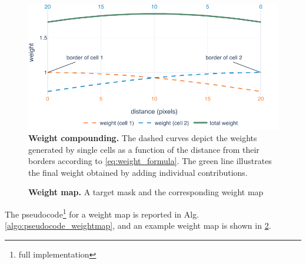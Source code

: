 %
\begin{figure}
    \centering
    \includegraphics[width=\textwidth]{figures/130_methods/weights_calculation.pdf}
    \caption{\textbf{Weight compounding.}
    The dashed curves depict the weights generated by single cells as a function of the distance from their borders according to \cref{eq:weight_formula}.
    The green line illustrates the final weight obtained by adding individual contributions.}
    \label{fig:weight_calculation}
\end{figure}
%
\begin{figure}
    \centering
    \caption{\textbf{Weight map.} A target mask and the corresponding weight map}
    \label{fig:weight_map_example}
\end{figure}
%
The pseudocode\footnote{full implementation \githubweights} for a weight map is reported in Alg. \ref{algo:pseudocode_weightmap}, and an example weight map is shown in \cref{fig:weight_map_example}.

